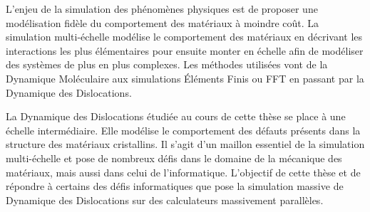 \documentclass[11pt,class=article,float=false,crop=false]{standalone}
\begin{document}

L'enjeu de la simulation des phénomènes physiques est de proposer une modélisation fidèle du comportement des matériaux à moindre coût. La simulation multi-échelle modélise le comportement des matériaux en décrivant les interactions les plus élémentaires pour ensuite monter en échelle afin de modéliser des systèmes de plus en plus complexes. Les méthodes utilisées vont de la Dynamique Moléculaire aux simulations Éléments Finis ou FFT en passant par la Dynamique des Dislocations.

La Dynamique des Dislocations étudiée au cours de cette thèse se place à une échelle intermédiaire. Elle modélise le comportement des défauts présents dans la structure des matériaux cristallins. Il s'agit d'un maillon essentiel de la simulation multi-échelle et pose de nombreux défis dans le domaine de la mécanique des matériaux, mais aussi dans celui de l'informatique. L'objectif de cette thèse et de répondre à certains des défis informatiques que pose la simulation massive de Dynamique des Dislocations sur des calculateurs massivement parallèles.

\end{document}

